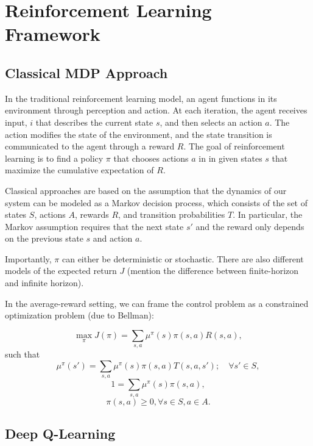 \documentclass[a4paper]{article}
\begin{document}
\section{Reinforcement Learning Framework}

\subsection{Classical MDP Approach}



In the traditional reinforcement learning model, an agent functions in its environment through perception and action.  At each iteration, the agent receives input, $i$ that describes the current state $s$, and then selects an action $a$.  The action modifies the state of the environment, and the state transition is communicated to the agent through a reward $R$.  The goal of reinforcement learning is to find a policy $\pi$ that chooses actions $a$ in in given states $s$ that maximize the cumulative expectation of $R$.

Classical approaches are based on the assumption that the dynamics of our system can be modeled as a Markov decision process, which consists of the set of states $S$, actions $A$, rewards $R$, and transition probabilities $T$.  In particular, the Markov assumption requires that the next state $s'$ and the reward only depends on the previous state $s$ and action $a$.

Importantly, $\pi$ can either be deterministic or stochastic.  There are also different models of the expected return $J$ (mention the difference between finite-horizon and infinite horizon).

In the average-reward setting, we can frame the control problem as a constrained optimization problem (due to Bellman):

\[
  \max_{\pi} J(\pi) = \sum_{s, a} \mu^\pi (s) \pi (s, a) R(s, a),
\]
such that
\[
  \mu^\pi(s') = \sum_{s, a} \mu^\pi (s) \pi (s, a) T(s, a, s'); \quad \forall s' \in S,
\]
\[
  1 = \sum_{s, a} \mu^{\pi} (s) \pi (s, a),
\]
\[
  \pi(s, a) \geq 0, \forall s \in S, a \in A.
\]

\subsection{Deep Q-Learning}
\end{document}
